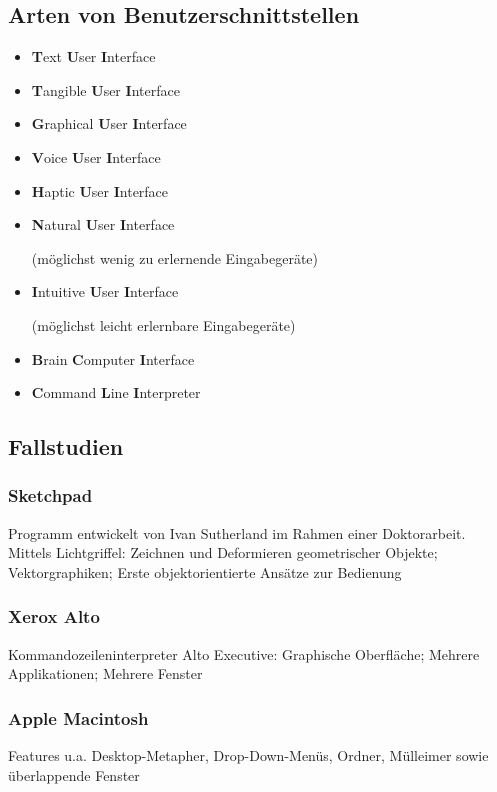 \documentclass
[
	8pt,		%
	ngerman,	%
	a4paper,	%
	landscape,	%
	final		%
]{extarticle}
\begin{document}
\begin{multicols*}{4}
	\subsection{Arten von Benutzerschnittstellen}
	\begin{itemize}
		\item \textbf{T}ext \textbf{U}ser \textbf{I}nterface
		\item \textbf{T}angible \textbf{U}ser \textbf{I}nterface
		\item \textbf{G}raphical \textbf{U}ser \textbf{I}nterface
		\item \textbf{V}oice \textbf{U}ser \textbf{I}nterface
		\item \textbf{H}aptic \textbf{U}ser \textbf{I}nterface
		\item \textbf{N}atural \textbf{U}ser \textbf{I}nterface\par
		      (möglichst wenig zu erlernende Eingabegeräte)
		\item \textbf{I}ntuitive \textbf{U}ser \textbf{I}nterface\par
		      (möglichst leicht erlernbare Eingabegeräte)
		\item \textbf{B}rain \textbf{C}omputer \textbf{I}nterface
		\item \textbf{C}ommand \textbf{L}ine \textbf{I}nterpreter
	\end{itemize}
	\subsection{Fallstudien}
	\subsubsection*{Sketchpad}
	Programm entwickelt von Ivan Sutherland im Rahmen einer Doktorarbeit. \\
	Mittels Lichtgriffel: Zeichnen und Deformieren geometrischer Objekte;
	Vektorgraphiken; Erste objektorientierte Ansätze zur Bedienung
	\subsubsection*{Xerox Alto}
	Kommandozeileninterpreter Alto Executive: Graphische Oberfläche;
	Mehrere Applikationen; Mehrere Fenster
	\subsubsection*{Apple Macintosh}
	Features u.a. Desktop-Metapher, Drop-Down-Menüs, Ordner, Mülleimer sowie
	überlappende Fenster

\end{multicols*}
\end{document}
